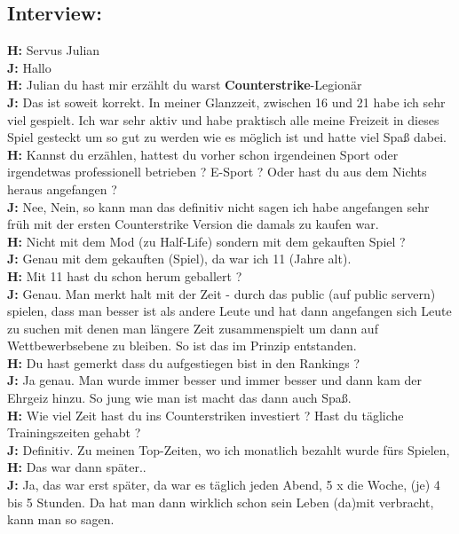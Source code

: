 \subsection*{Interview:}
\textbf{H:} Servus Julian
\\ \textbf{J:} Hallo
\\ \textbf{H:} Julian du hast mir erzählt du warst \textbf{Counterstrike}-Legionär
\\ \textbf{J:} Das ist soweit korrekt. In meiner Glanzzeit, zwischen 16 und 21 habe ich sehr viel gespielt. Ich war sehr aktiv und habe praktisch alle meine Freizeit in dieses Spiel gesteckt um so gut zu werden wie es möglich ist und hatte viel Spaß dabei.
\\ \textbf{H:} Kannst du erzählen, hattest du vorher schon irgendeinen Sport oder irgendetwas professionell betrieben ? E-Sport ? Oder hast du aus dem Nichts heraus angefangen ?
\\ \textbf{J:} Nee, Nein, so kann man das definitiv nicht sagen ich habe angefangen sehr früh mit der ersten Counterstrike Version die damals zu kaufen war.
\\ \textbf{H:} Nicht mit dem Mod (zu Half-Life) sondern mit dem gekauften Spiel ?
\\ \textbf{J:} Genau mit dem gekauften (Spiel), da war ich 11 (Jahre alt).
\\ \textbf{H:} Mit 11 hast du schon herum geballert ?
\\ \textbf{J:} Genau. Man merkt halt mit der Zeit - durch das public (auf public servern) spielen, dass man besser ist als andere Leute und hat dann angefangen sich Leute zu suchen mit denen man längere Zeit zusammenspielt um dann auf Wettbewerbsebene zu bleiben. So ist das im Prinzip entstanden.
\\ \textbf{H:} Du hast gemerkt dass du aufgestiegen bist in den Rankings ?
\\ \textbf{J:} Ja genau. Man wurde immer besser und immer besser und dann kam der Ehrgeiz hinzu. So jung wie man ist macht das dann auch Spaß.
\\ \textbf{H:} Wie viel Zeit hast du ins Counterstriken investiert ? Hast du tägliche Trainingszeiten gehabt ?
\\ \textbf{J:} Definitiv. Zu meinen Top-Zeiten, wo ich monatlich bezahlt wurde fürs Spielen,
\\ \textbf{H:} Das war dann später..
\\ \textbf{J:} Ja, das war erst später, da war es täglich jeden Abend, 5 x die Woche, (je) 4 bis 5 Stunden. Da hat man dann wirklich schon sein Leben (da)mit verbracht, kann man so sagen.
